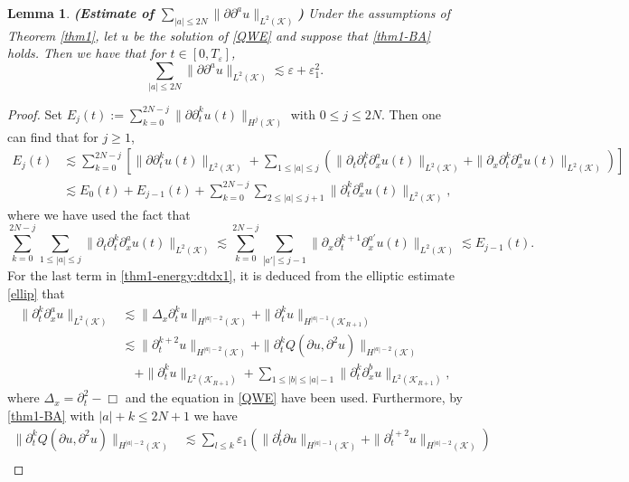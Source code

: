 \documentclass[11pt,twoside]{article}
\def\cK{\mathcal K}
\def\ds{\displaystyle}
\def\p{\partial}
\def\ve{\varepsilon}
\def\ls{\lesssim}
\theoremstyle{plain}
\newtheorem{lemma}[theorem]{Lemma}
\theoremstyle{definition}
\numberwithin{equation}{section}
\begin{document}
\begin{lemma}\label{Son-4.3}
{\bf (Estimate of $\ds\sum_{|a|\le2N}\|\p\p^au\|_{L^2(\cK)}$)}
Under the assumptions of Theorem \ref{thm1}, let $u$ be the solution of \eqref{QWE} and suppose that \eqref{thm1-BA} holds.
Then we have that for $t\in[0,T_\ve]$,
\begin{equation}\label{thm1-energy:dtdx}
\sum_{|a|\le2N}\|\p\p^au\|_{L^2(\cK)}\ls\ve+\ve_1^2.
\end{equation}
\end{lemma}
\begin{proof}
Set $\ds E_j(t):=\sum_{k=0}^{2N-j}\|\p\p_t^ku(t)\|_{H^j(\cK)}$ with $0\le j\le2N$.
Then one can find that for $j\ge1$,
\begin{equation}\label{thm1-energy:dtdx1}
\begin{split}
E_j(t)&\ls\sum_{k=0}^{2N-j}[\|\p\p_t^ku(t)\|_{L^2(\cK)}
+\sum_{1\le|a|\le j}(\|\p_t\p_t^k\p_x^au(t)\|_{L^2(\cK)}+\|\p_x\p_t^k\p_x^au(t)\|_{L^2(\cK)})]\\
&\ls E_0(t)+E_{j-1}(t)+\sum_{k=0}^{2N-j}\sum_{2\le|a|\le j+1}\|\p_t^k\p_x^au(t)\|_{L^2(\cK)},
\end{split}
\end{equation}
where we have used the fact that
\begin{equation*}
\sum_{k=0}^{2N-j}\sum_{1\le|a|\le j}\|\p_t\p_t^k\p_x^au(t)\|_{L^2(\cK)}
\ls\sum_{k=0}^{2N-j}\sum_{|a'|\le j-1}\|\p_x\p_t^{k+1}\p_x^{a'}u(t)\|_{L^2(\cK)}
\ls E_{j-1}(t).
\end{equation*}
For the last term in \eqref{thm1-energy:dtdx1}, it is deduced from the elliptic estimate \eqref{ellip} that
\begin{equation}\label{thm1-energy:dtdx2}
\begin{split}
\|\p_t^k\p_x^au\|_{L^2(\cK)}&\ls\|\Delta_x\p_t^ku\|_{H^{|a|-2}(\cK)}+\|\p_t^ku\|_{H^{|a|-1}(\cK_{R+1})}\\
&\ls\|\p_t^{k+2}u\|_{H^{|a|-2}(\cK)}+\|\p_t^kQ(\p u,\p^2u)\|_{H^{|a|-2}(\cK)}\\
&\quad+\|\p_t^ku\|_{L^2(\cK_{R+1})}+\sum_{1\le|b|\le|a|-1}\|\p_t^k\p_x^bu\|_{L^2(\cK_{R+1})},
\end{split}
\end{equation}
where $\Delta_x=\p_t^2-\Box$ and the equation in \eqref{QWE} have been used.
Furthermore, by \eqref{thm1-BA} with $|a|+k\le2N+1$ we have
\begin{equation}\label{thm1-energy:dtdx3}
\begin{split}
\|\p_t^kQ(\p u,\p^2u)\|_{H^{|a|-2}(\cK)}
&\ls\sum_{l\le k}\ve_1(\|\p_t^l\p u\|_{H^{|a|-1}(\cK)}+\|\p_t^{l+2}u\|_{H^{|a|-2}(\cK)})\\

\end{split}
\end{equation}
\end{proof}
\end{document}
